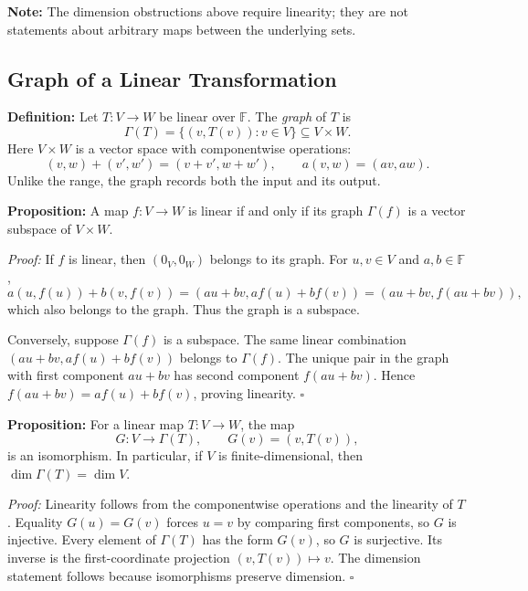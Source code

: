 \documentclass[a4paper,11pt,abstract=true]{scrartcl}
\theoremstyle{dotlessP}
\theoremstyle{dotlessS}
\theoremstyle{remark}
\theoremstyle{definition}
\begin{document}
\begin{remark_box}
\textbf{Note:} The dimension obstructions above require linearity;
they are not statements about arbitrary maps between the underlying
sets.
\end{remark_box}

\subsection{Graph of a Linear Transformation}

\begin{definition_box}
\textbf{Definition:} Let
$T:V\longrightarrow W$ be linear over $\mathbb{F}$. The \emph{graph}
of $T$ is
\[
\Gamma(T)=\{(v,T(v)):v\in V\}\subseteq V\times W.
\]
Here $V\times W$ is a vector space with componentwise operations:
\[
(v,w)+(v',w')=(v+v',w+w'),\qquad a(v,w)=(av,aw).
\]
Unlike the range, the graph records both the input and its output.
\end{definition_box}

\begin{problem_box}
\textbf{Proposition:} A map
$f:V\longrightarrow W$ is linear if and only if its graph
$\Gamma(f)$ is a vector subspace of $V\times W$.

\end{problem_box}

\begin{claim_box}
\textit{Proof:} If $f$ is linear, then $(0_V,0_W)$ belongs to its
graph. For $u,v\in V$ and $a,b\in\mathbb{F}$,
\[
a(u,f(u))+b(v,f(v))=(au+bv,af(u)+bf(v))
=(au+bv,f(au+bv)),
\]
which also belongs to the graph. Thus the graph is a subspace.

Conversely, suppose $\Gamma(f)$ is a subspace. The same linear
combination $(au+bv,af(u)+bf(v))$ belongs to $\Gamma(f)$.
The unique pair in the graph with first component $au+bv$ has second
component $f(au+bv)$. Hence
$f(au+bv)=af(u)+bf(v)$, proving linearity. \hfill$\square$
\end{claim_box}

\begin{problem_box}
\textbf{Proposition:}
For a linear map $T:V\longrightarrow W$, the map
\[
G:V\longrightarrow\Gamma(T),\qquad G(v)=(v,T(v)),
\]
is an isomorphism. In particular, if $V$ is finite-dimensional, then
$\dim\Gamma(T)=\dim V$.

\end{problem_box}

\begin{claim_box}
\textit{Proof:} Linearity follows from the componentwise operations
and the linearity of $T$. Equality $G(u)=G(v)$ forces $u=v$ by
comparing first components, so $G$ is injective. Every element of
$\Gamma(T)$ has the form $G(v)$, so $G$ is surjective. Its inverse
is the first-coordinate projection $(v,T(v))\mapsto v$.
The dimension statement follows because isomorphisms preserve
dimension. \hfill$\square$
\end{claim_box}
\end{document}
